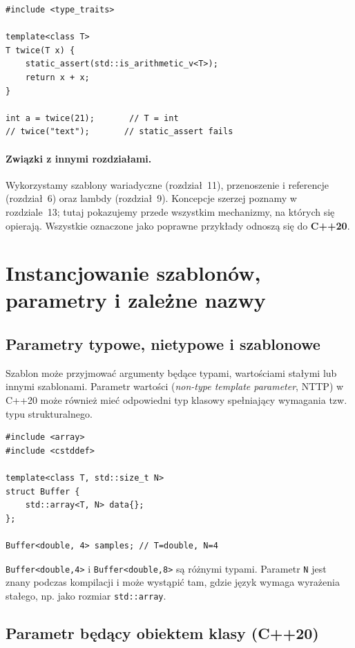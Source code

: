 \begin{lstlisting}
#include <type_traits>

template<class T>
T twice(T x) {
    static_assert(std::is_arithmetic_v<T>);
    return x + x;
}

int a = twice(21);       // T = int
// twice("text");       // static_assert fails
\end{lstlisting}

\paragraph{Związki z innymi rozdziałami.}
Wykorzystamy szablony wariadyczne (rozdział~11),
przenoszenie i referencje (rozdział~6) oraz lambdy (rozdział~9).
Koncepcje szerzej poznamy w rozdziale~13; tutaj pokazujemy
przede wszystkim mechanizmy, na których się opierają.
Wszystkie oznaczone jako poprawne przykłady odnoszą się do \textbf{C++20}.

\section{Instancjowanie szablonów, parametry i zależne nazwy}
\label{sec:cpp9-instantiation}

\subsection{Parametry typowe, nietypowe i szablonowe}

Szablon może przyjmować argumenty będące typami, wartościami stałymi
lub innymi szablonami. Parametr wartości (\textit{non-type template parameter},
NTTP) w C++20 może również mieć odpowiedni typ klasowy spełniający
wymagania tzw. typu strukturalnego.

\begin{lstlisting}
#include <array>
#include <cstddef>

template<class T, std::size_t N>
struct Buffer {
    std::array<T, N> data{};
};

Buffer<double, 4> samples; // T=double, N=4
\end{lstlisting}

\texttt{Buffer<double,4>} i \texttt{Buffer<double,8>} są różnymi typami.
Parametr \texttt{N} jest znany podczas kompilacji i może wystąpić tam,
gdzie język wymaga wyrażenia stałego, np. jako rozmiar \texttt{std::array}.

\subsection{Parametr będący obiektem klasy (C++20)}

